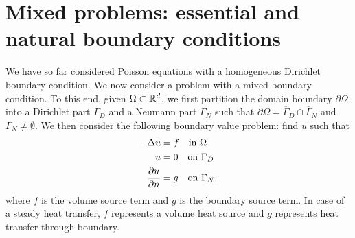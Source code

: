 \section{Mixed problems: essential and natural boundary conditions}
\label{sec:posnd_mixed}
We have so far considered Poisson equations with a homogeneous Dirichlet boundary condition.  We now consider a problem with a mixed boundary condition. To this end, given $\Omega \subset \mathbb{R}^d$, we first partition the domain boundary $\partial \Omega$ into a Dirichlet part $\Gamma_D$ and a Neumann part $\Gamma_N$ such that $\overline{\partial \Omega} = \overline \Gamma_D \cap \overline \Gamma_N$ and $\Gamma_N \neq \emptyset$.  We then consider the following boundary value problem: find $u$ such that
\begin{align}
  -\Delta u &= f \quad \text{in } \Omega \notag \\
  u &= 0 \quad \text{on } \Gamma_D \label{eq:posnd_mixed_bc_strong} \\
  \frac{\partial u}{\partial n} &= g \quad \text{on } \Gamma_N, \notag
\end{align}
where $f$ is the volume source term and $g$ is the boundary source term.  In case of a steady heat transfer, $f$ represents a volume heat source and $g$ represents heat transfer through boundary.


